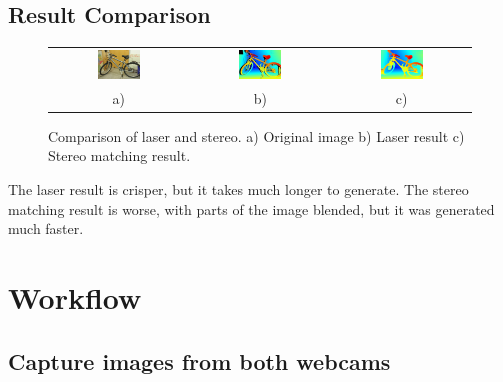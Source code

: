 \documentclass[11pt,fleqn]{article}
\begin{document}
\subsection{Result Comparison}
\begin{figure}[!ht]
\centering
\setlength{}
\begin{tabular}{ccc}
\includegraphics[width=0.33\textwidth]{images/_im0-600.jpg} &
\includegraphics[width=0.33\textwidth]{images/disp0GT-600.jpg} &
\includegraphics[width=0.33\textwidth]{images/_disp-600.jpg} \\[2pt]
a) & b) & c) \\
\end{tabular}
\caption{Comparison of laser and stereo. a) Original image b) Laser result c) Stereo matching result.}
\label{fig:result1}
\end{figure}

The laser result is crisper, but it takes much longer to generate. The stereo matching result is worse, with parts of the image blended, but it was generated much faster. 

\section{Workflow}

\subsection{Capture images from both webcams}  
\end{document}
